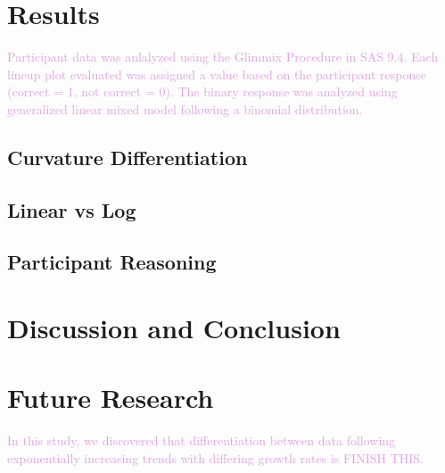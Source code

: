 \documentclass[]{interact}
\theoremstyle{plain}%
\theoremstyle{definition}
\theoremstyle{remark}
\begin{document}
\hypertarget{results}{%
\section{Results}\label{results}}

\textcolor{Plum}{
Participant data was anlalyzed using the Glimmix Procedure in SAS 9.4. Each lineup plot evaluated was assigned a value based on the participant response (correct = 1, not correct = 0). The binary response was analyzed using generalized linear mixed model following a binomial distribution. 
}

\hypertarget{curvature-differentiation}{%
\subsection{Curvature Differentiation}\label{curvature-differentiation}}

\hypertarget{linear-vs-log}{%
\subsection{Linear vs Log}\label{linear-vs-log}}

\hypertarget{participant-reasoning}{%
\subsection{Participant Reasoning}\label{participant-reasoning}}

\hypertarget{discussion-and-conclusion}{%
\section{Discussion and Conclusion}\label{discussion-and-conclusion}}

\hypertarget{future-research}{%
\section{Future Research}\label{future-research}}

\textcolor{Plum}{
In this study, we discovered that differentiation between data following exponentially increasing trends with differing growth rates is FINISH THIS.
}
\end{document}
